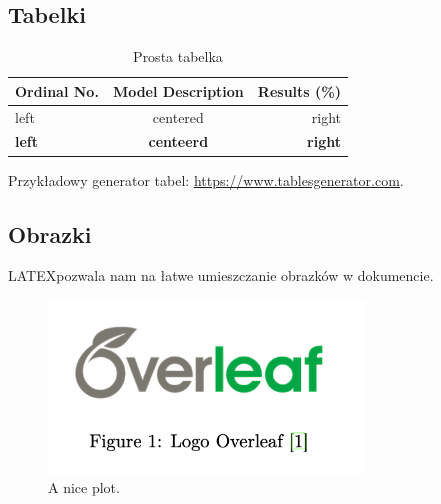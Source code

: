 \documentclass{article}
\begin{document}
    \subsection{Tabelki}




\begin{table}[htbp]
\centering

\label{tab:example}
\begin{tabular}{|l|c|r|}
\hline
Ordinal No. & Model Description & Results (\%) \\
\hline
left & centered & right \\
\hline
\textbf{left} & \textbf{centeerd} & \textbf{right} \\

\hline
\end{tabular}
\caption{Prosta tabelka}
\end{table}
Przykładowy generator tabel: \url{https://www.tablesgenerator.com}.

    \subsection{Obrazki}
LATEXpozwala nam na łatwe umieszczanie obrazków w dokumencie.
\begin{figure}[h]
    \centering
    \includegraphics[width=0.75\textwidth]{logo}
    \caption{A nice plot.}
    \label{fig:mesh1}
\end{figure}


    
\end{document}
